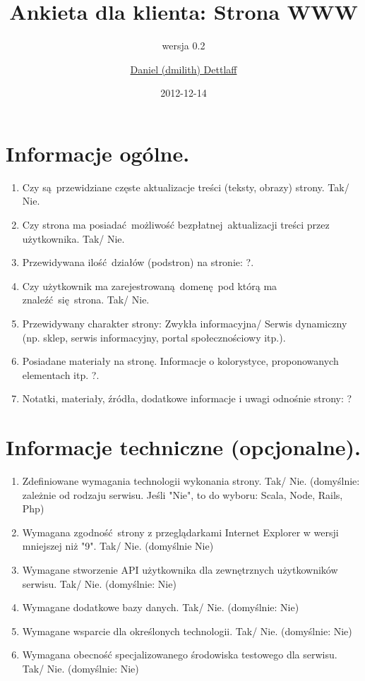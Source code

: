\documentclass[11pt,a4paper]{scrartcl}
\title{Ankieta dla klienta: Strona WWW}
\subtitle{wersja 0.2}
\author{\href{mailto:dmilith@verknowsys.com}{Daniel (dmilith) Dettlaff}}
\date{2012-12-14}
\begin{document}
\renewcommand\thesection{\arabic{section}.}
\renewcommand\thesubsection{\arabic{section}.\arabic{subsection}.}
\renewcommand\thesubsubsection{\arabic{section}.\arabic{subsection}.\arabic{subsubsection}.}

\maketitle

\section{Informacje ogólne.}\label{sec:ogolne}
  \begin{enumerate}
    \item Czy są przewidziane częste aktualizacje treści (teksty, obrazy) strony. Tak/ Nie.
    \item Czy strona ma posiadać możliwość bezpłatnej aktualizacji treści przez użytkownika. Tak/ Nie.
    \item Przewidywana ilość działów (podstron) na stronie: ?.
    \item Czy użytkownik ma zarejestrowaną domenę pod którą ma znaleźć się strona. Tak/ Nie.
    \item Przewidywany charakter strony: Zwykła informacyjna/ Serwis dynamiczny (np. sklep, serwis informacyjny, portal społecznościowy itp.).
    \item Posiadane materiały na stronę. Informacje o kolorystyce, proponowanych elementach itp. ?.
    \item Notatki, materiały, źródła, dodatkowe informacje i uwagi odnośnie strony: ?
  \end{enumerate}


\section{Informacje techniczne (opcjonalne).}\label{sec:techniczne}
  \begin{enumerate}
    \item Zdefiniowane wymagania technologii wykonania strony. Tak/ Nie. (domyślnie: zależnie od rodzaju serwisu. Jeśli "Nie", to do wyboru: Scala, Node, Rails, Php)
    \item Wymagana zgodność strony z przeglądarkami Internet Explorer w wersji mniejszej niż "9". Tak/ Nie. (domyślnie Nie)
    \item Wymagane stworzenie API użytkownika dla zewnętrznych użytkowników serwisu. Tak/ Nie. (domyślnie: Nie)
    \item Wymagane dodatkowe bazy danych. Tak/ Nie. (domyślnie: Nie)
    \item Wymagane wsparcie dla określonych technologii. Tak/ Nie. (domyślnie: Nie)
    \item Wymagana obecność specjalizowanego środowiska testowego dla serwisu. Tak/ Nie. (domyślnie: Nie)
  \end{enumerate}
\end{document}
